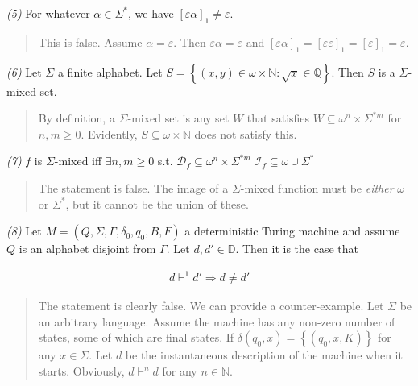 \documentclass[a4paper, 12pt]{article}
\begin{document}
\textit{(5)} For whatever $\alpha \in \Sigma^{*}$, we have $[\varepsilon
\alpha]_1 \neq \varepsilon $. 





\small
\begin{quote}

This is false. Assume $\alpha = \varepsilon $. Then $\varepsilon  \alpha =
\varepsilon $ and $[\varepsilon \alpha]_1 = [\varepsilon \varepsilon ]_1 =
[\varepsilon ]_1 = \varepsilon $.

\end{quote}
\normalsize


\textit{(6)} Let $\Sigma$ a finite alphabet. Let $S = \left\{ (x, y) \in
\omega\times \mathbb{N} : \sqrt{x} \in \mathbb{Q}  \right\}$. Then $S$ is a
$\Sigma$-mixed set.

\small
\begin{quote}

By definition, a $\Sigma$-mixed set is any set $W$ that satisfies $W \subseteq
\omega^{n} \times \Sigma^{*m} $ for $n, m \geq 0$. Evidently, $S \subseteq
\omega \times \mathbb{N}$ does not satisfy this.

\end{quote}
\normalsize


\textit{(7)} $f$ is $\Sigma$-mixed iff $\exists n, m \geq 0$ s.t. $\mathcal{D}_f
\subseteq \omega^{n} \times \Sigma^{*m} $ \land $\mathcal{I}_f \subseteq \omega
\cup \Sigma^{*}$


\small
\begin{quote}

The statement is false. The image of a $\Sigma$-mixed function must be
\textit{either} $\omega$ or $\Sigma^{*}$, but it cannot be the union of these. 

\end{quote}
\normalsize




\textit{(8)} Let $M = (Q, \Sigma, \Gamma, \delta_0, q_0, B, F)$ a deterministic
Turing machine and assume $Q$ is an alphabet disjoint from $\Gamma$. Let $d, d'
\in \mathbb{D}$. Then it is the case that 

\begin{align*}
    d \vdash^1 d' \Rightarrow d\neq d'
\end{align*}


\small
\begin{quote}

The statement is clearly false. We can provide a counter-example. Let $\Sigma$
be an arbitrary language. Assume the machine has any non-zero number of states,
some of which are final states. If $\delta(q_0, x) = \left\{ (q_0, x, K)
\right\} $ for any $x \in \Sigma$. Let $d$ be the instantaneous description of
the machine when it starts. Obviously, $d \vdash^n d$ for any $n \in
\mathbb{N}$.

\end{quote}
\normalsize
\end{document}
